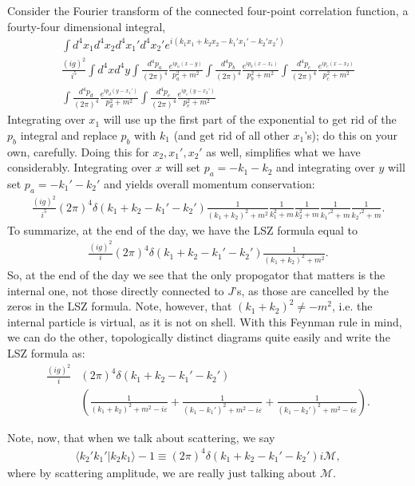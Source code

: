 \documentclass{../mathnotes}
\begin{document}
Consider the Fourier transform of the connected four-point correlation function, a fourty-four dimensional integral,
\begin{align*}
    \int d^4x_1d^4x_2d^4x_1'd^4x_2'e^{i(k_1x_1+k_2x_2-k_1'x_1'-k_2'x_2')}\\
    \frac{(ig)^2}{i^5}\int d^4xd^4y\int \frac{d^4p_a}{(2\pi)^4}\frac{e^{ip_a(x-y)}}{p_a^2+m^2}
    \int \frac{d^4p_b}{(2\pi)^4}\frac{e^{ip_b(x-x_1)}}{p_b^2+m^2}\int \frac{d^4p_c}{(2\pi)^4}\frac{e^{ip_c(x-x_2)}}{p_c^2+m^2}\\
    \int \frac{d^4p_d}{(2\pi)^4}\frac{e^{ip_d(y-x_1')}}{p_d^2+m^2}    \int \frac{d^4p_e}{(2\pi)^4}\frac{e^{ip_e(y-x_2')}}{p_e^2+m^2}
\end{align*}
Integrating over $x_1$ will use up the first part of the exponential to get rid of the $p_b$ integral and replace $p_b$ with $k_1$ (and
get rid of all other $x_1$'s); do this on your own, carefully. Doing this for $x_2,x_1',x_2'$ as well, simplifies what we have considerably.
Integrating over $x$ will set $p_a=-k_1-k_2$ and integrating over $y$ will set $p_a=-k_1'-k_2'$ and yields overall momentum conservation:
\begin{align*}
    \frac{(ig)^2}{i^5}(2\pi)^4\delta(k_1+k_2-k_1'-k_2')\frac{1}{(k_1+k_2)^2+m^2}\frac{1}{k_1^2+m}\frac{1}{k_2^2+m}\frac{1}{k_1'^2+m}\frac{1}{k_2'^2+m}.
\end{align*}
To summarize, at the end of the day, we have the LSZ formula equal to
\begin{align*}
    \frac{(ig)^2}{i}(2\pi)^4\delta(k_1+k_2-k_1'-k_2')\frac{1}{(k_1+k_2)^2+m^2}.
\end{align*}
So, at the end of the day we see that the only propogator that matters is the internal one, not those directly connected to $J$'s, as those are
cancelled by the zeros in the LSZ formula. Note, however, that $(k_1+k_2)^2\neq -m^2$, i.e. the internal particle is virtual, as it is not
on shell.
With this Feynman rule in mind, we can do the other, topologically distinct diagrams quite easily and write the LSZ formula as:
\begin{align*}
    \frac{(ig)^2}{i}&(2\pi)^4\delta(k_1+k_2-k_1'-k_2')\\
    &\left(\frac{1}{(k_1+k_2)^2+m^2-i\varepsilon}+\frac{1}{(k_1-k_1')^2+m^2-i\varepsilon}+\frac{1}{(k_1-k_2')^2+m^2-i\varepsilon}\right).
\end{align*}

Note, now, that when we talk about scattering, we say
\begin{align*}
    \langle k_2'k_1'|k_2k_1\rangle-1\equiv(2\pi)^4\delta(k_1+k_2-k_1'-k_2')i\mathcal{M},
\end{align*}
where by scattering amplitude, we are really just talking about $\mathcal{M}$.
\end{document}
